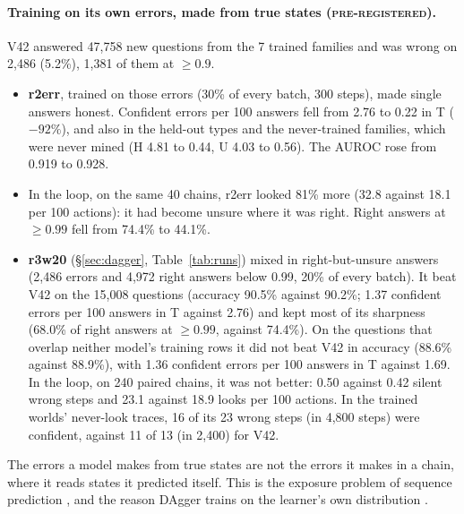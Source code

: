 \documentclass[11pt]{article}
\newcommand{\prereg}{\textsc{pre-registered}}
\begin{document}
\paragraph{Training on its own errors, made from true states (\prereg).} V42 answered 47,758 new
questions from the 7 trained families and was wrong on 2,486 (5.2\%), 1,381 of them at $\ge 0.9$.
\begin{itemize}
  \item \textbf{r2err}, trained on those errors (30\% of every batch, 300 steps), made single answers honest. Confident
  errors per 100 answers fell from 2.76 to 0.22 in T ($-92\%$), and also in the held-out types and the never-trained
  families, which were never mined (H 4.81 to 0.44, U 4.03 to 0.56). The AUROC rose from 0.919 to 0.928.
  \item In the loop, on the same 40 chains, r2err looked 81\% more (32.8 against 18.1 per 100 actions): it had become
  unsure where it was right. Right answers at $\ge 0.99$ fell from 74.4\% to 44.1\%.
  \item \textbf{r3w20} (\S\ref{sec:dagger}, Table~\ref{tab:runs}) mixed in right-but-unsure answers (2,486 errors and
  4,972 right answers below 0.99, 20\% of every batch). It beat V42 on the 15,008 questions (accuracy
  90.5\% against 90.2\%; 1.37 confident errors per 100 answers in T against 2.76) and kept most of its sharpness
  (68.0\% of right answers at $\ge 0.99$, against 74.4\%). On the questions that overlap neither model's training rows
  it did not beat V42 in accuracy (88.6\% against 88.9\%), with 1.36 confident errors per 100 answers in T against
  1.69. In the loop, on 240 paired chains, it was not better: 0.50 against 0.42 silent
  wrong steps and 23.1 against 18.9 looks per 100 actions. In the trained worlds' never-look traces, 16 of its 23 wrong
  steps (in 4,800 steps) were confident, against 11 of 13 (in 2,400) for V42.
\end{itemize}
The errors a model makes from true states are not the errors it makes in a chain, where it reads states it predicted
itself. This is the exposure problem of sequence prediction \cite{bengio2015,ranzato2016}, and the reason DAgger trains
on the learner's own distribution \cite{ross2011}.
\end{document}
